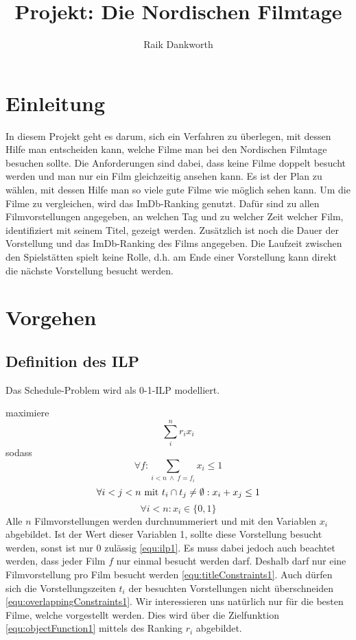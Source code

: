 \documentclass[a4paper, 12pt]{article}
\title{Projekt: Die Nordischen Filmtage}
\author{
    Raik Dankworth}
\date{}
\begin{document}
\maketitle

\section{Einleitung}

In diesem Projekt geht es darum, sich ein Verfahren zu überlegen, mit dessen Hilfe man entscheiden kann, welche Filme man bei den Nordischen Filmtage besuchen sollte.
Die Anforderungen sind dabei, dass keine Filme doppelt besucht werden und man nur ein Film gleichzeitig ansehen kann.
Es ist der Plan zu wählen, mit dessen Hilfe man so viele gute Filme wie möglich sehen kann.
Um die Filme zu vergleichen, wird das ImDb-Ranking genutzt.
Dafür sind zu allen Filmvorstellungen angegeben, an welchen Tag und zu welcher Zeit welcher Film, identifiziert mit seinem Titel, gezeigt werden. 
Zusätzlich ist noch die Dauer der Vorstellung und das ImDb-Ranking des Films angegeben.
Die Laufzeit zwischen den Spielstätten spielt keine Rolle, d.h. am Ende einer Vorstellung kann direkt die nächste Vorstellung besucht werden.

\section{Vorgehen}

\subsection{Definition des ILP}
Das Schedule-Problem wird als 0-1-ILP modelliert.

 maximiere 
\begin{equation} \label{equ:objectFunction1}
    \sum_i^n r_i x_i
\end{equation}
 sodass 
\begin{equation} \label{equ:titleConstraints1}
    \forall f: \sum\limits_{i < n \> \land \> f = f_i} x_i \leq 1
\end{equation}
\begin{equation} \label{equ:overlappingConstraints1}
    \forall i < j < n \textmd{ mit  } t_i \cap t_j \neq \emptyset: x_i + x_j \leq 1
\end{equation}
\begin{equation} \label{equ:ilp1}
    \forall i < n: x_i \in \{0, 1\}
\end{equation}
Alle $n$ Filmvorstellungen werden durchnummeriert und mit den Variablen $x_i$ abgebildet.
Ist der Wert dieser Variablen 1, sollte diese Vorstellung besucht werden, sonst ist nur 0 zulässig \eqref{equ:ilp1}.
Es muss dabei jedoch auch beachtet werden, dass jeder Film $f$ nur einmal besucht werden darf.
Deshalb darf nur eine Filmvorstellung pro Film besucht werden \eqref{equ:titleConstraints1}.
Auch dürfen sich die Vorstellungszeiten $t_i$ der besuchten Vorstellungen nicht überschneiden \eqref{equ:overlappingConstraints1}.
Wir interessieren uns natürlich nur für die besten Filme, welche vorgestellt werden.
Dies wird über die Zielfunktion \eqref{equ:objectFunction1} mittels des Ranking $r_i$ abgebildet.
\end{document}
